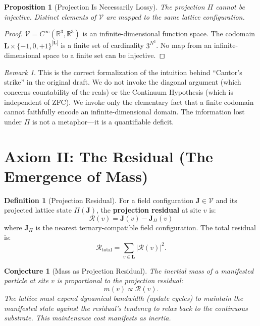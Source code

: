 \documentclass[11pt,twoside]{article}
\theoremstyle{definition}
\newtheorem{definition}[axiom]{Definition}
\theoremstyle{plain}
\newtheorem{proposition}[axiom]{Proposition}
\newtheorem{conjecture}[axiom]{Conjecture}
\theoremstyle{remark}
\newtheorem{remark}[axiom]{Remark}
\newcommand{\Void}{\mathcal{V}}
\newcommand{\Lattice}{\mathbf{L}}
\newcommand{\Real}{\mathbb{R}}
\begin{document}
\begin{proposition}[Projection Is Necessarily Lossy]\label{prop:lossy}
The projection $\Pi$ cannot be injective. Distinct elements of $\Void$ are mapped to the same lattice configuration.
\end{proposition}

\begin{proof}
$\Void = C^\infty(\Real^3, \Real^3)$ is an infinite-dimensional function space. The codomain $\Lattice \times \{-1,0,+1\}^{|\Lattice|}$ is a finite set of cardinality $3^{N^3}$. No map from an infinite-dimensional space to a finite set can be injective. \qedhere
\end{proof}

\begin{remark}
This is the correct formalization of the intuition behind ``Cantor's strike'' in the original draft. We do not invoke the diagonal argument (which concerns countability of the reals) or the Continuum Hypothesis (which is independent of ZFC). We invoke only the elementary fact that a finite codomain cannot faithfully encode an infinite-dimensional domain. The information lost under $\Pi$ is not a metaphor---it is a quantifiable deficit.
\end{remark}

\section{Axiom II: The Residual (The Emergence of Mass)}

\begin{definition}[Projection Residual]\label{def:residual}
For a field configuration $\mathbf{J} \in \Void$ and its projected lattice state $\Pi(\mathbf{J})$, the \textbf{projection residual} at site $v$ is:
\begin{equation}
    \mathcal{R}(v) = \mathbf{J}(v) - \mathbf{J}_{\Pi}(v)
\end{equation}
where $\mathbf{J}_\Pi$ is the nearest ternary-compatible field configuration. The total residual is:
\begin{equation}
    \mathcal{R}_{\text{total}} = \sum_{v \in \Lattice} |\mathcal{R}(v)|^2.
\end{equation}
\end{definition}

\begin{conjecture}[Mass as Projection Residual]\label{conj:mass}
The inertial mass of a manifested particle at site $v$ is proportional to the projection residual:
\begin{equation}
    m(v) \propto \mathcal{R}(v).
\end{equation}
The lattice must expend dynamical bandwidth (update cycles) to maintain the manifested state against the residual's tendency to relax back to the continuous substrate. This maintenance cost manifests as inertia.
\end{conjecture}
\end{document}
